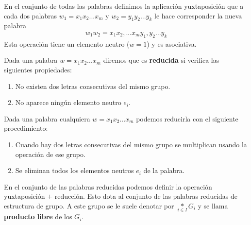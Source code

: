 \begin{definicion}
    En el conjunto de todas las palabras definimos la aplicación yuxtaposición que a cada dos palabras $w_1=x_1x_2...x_m$ y $w_2=y_1y_2...y_k$ le hace corresponder la nueva palabra
    \begin{gather*}
        w_1w_2 = x_1x_2,...x_my_1,y_2...y_k
    \end{gather*}
    Esta operación tiene un elemento neutro ($w=1$) y es asociativa.
\end{definicion}

\begin{definicion}
    Dada una palabra $w=x_1x_2...x_m$ diremos que es \textbf{reducida} si verifica las siguientes propiedades:
    \begin{enumerate}
        \item No existen dos letras consecutivas del mismo grupo.
        \item No aparece ningún elemento neutro $e_i$.
    \end{enumerate}
\end{definicion}

\begin{observacion}
    Dada una palabra cualquiera $w=x_1x_2...x_m$ podemos reducirla con el siguiente procedimiento:
    \begin{enumerate}
        \item Cuando hay dos letras consecutivas del mismo grupo se multiplican usando la operación de ese grupo.
        \item Se eliminan todos los elementos neutros $e_i$ de la palabra.
    \end{enumerate}
\end{observacion}

\begin{definicion}
    En el conjunto de las palabras reducidas podemos definir la operación yuxtaposición $+$ reducción. Esto dota al conjunto de las palabras reducidas de estructura de grupo. A este grupo se le suele denotar por $\underset{i\in I}{\ast}G_i$ y se llama \textbf{producto libre} de los $G_i$.
\end{definicion}

